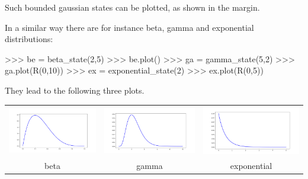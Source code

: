 \documentclass[leqno]{tufte-book} %
\begin{document}
\noindent Such bounded gaussian states can be plotted, as shown
in the margin.

In a similar way there are for instance beta, gamma and exponential
distributions:
\begin{python}
>>> be = beta_state(2,5)
>>> be.plot()
>>> ga = gamma_state(5,2)
>>> ga.plot(R(0,10))
>>> ex = exponential_state(2)
>>> ex.plot(R(0,5))
\end{python}

\noindent They lead to the following three plots.
\begin{center}
\begin{tabular}{ccc}
\includegraphics[width=15em]{Pictures/beta-2-5.png}
\hspace*{-1em} & \hspace*{-1em}
\includegraphics[width=15em]{Pictures/gamma-5-2.png}
\hspace*{-1em} & \hspace*{-1em}
\includegraphics[width=15em]{Pictures/exponential-2.png}
\\[-1em]
beta & gamma & exponential
\end{tabular}
\end{center}
\end{document}
